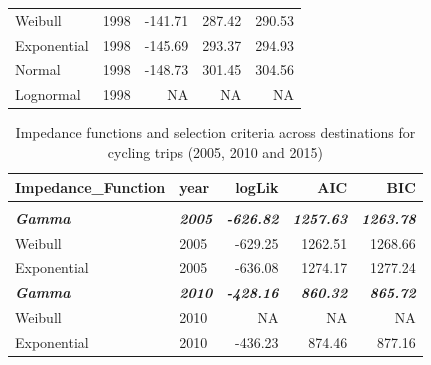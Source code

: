 \documentclass[
11pt, %
oneside, %
english, %
singlespacing, %
]{macthesis} %
\begin{document}
\begin{table}
\begin{tabular}[t]{llrrr}
\hspace{1em}Weibull & 1998 & -141.71 & 287.42 & 290.53\\
\hspace{1em}Exponential & 1998 & -145.69 & 293.37 & 294.93\\
\hspace{1em}Normal & 1998 & -148.73 & 301.45 & 304.56\\
\hspace{1em}Lognormal & 1998 & NA & NA & NA\\
\bottomrule
\end{tabular}
\end{table}

\begin{table}
\centering
\caption{\label{tab:ch03-make-table-08}\label{tab:ch03-table-08}Impedance functions and selection criteria across destinations for cycling trips (2005, 2010 and 2015)}
\centering
\fontsize{11}{13}\selectfont
\begin{tabular}[t]{llrrr}
\toprule
Impedance\_Function & year & logLik & AIC & BIC\\
\midrule
\addlinespace[0.3em]
\multicolumn{5}{l}{\textbf{Destination: Home}}\\
\begingroup\fontsize{10}{12}\selectfont \em{\textbf{\hspace{1em}Gamma}}\endgroup & \begingroup\fontsize{10}{12}\selectfont \em{\textbf{2005}}\endgroup & \begingroup\fontsize{10}{12}\selectfont \em{\textbf{-626.82}}\endgroup & \begingroup\fontsize{10}{12}\selectfont \em{\textbf{1257.63}}\endgroup & \begingroup\fontsize{10}{12}\selectfont \em{\textbf{1263.78}}\endgroup\\
\hspace{1em}Weibull & 2005 & -629.25 & 1262.51 & 1268.66\\
\hspace{1em}Exponential & 2005 & -636.08 & 1274.17 & 1277.24\\
\begingroup\fontsize{10}{12}\selectfont \em{\textbf{\hspace{1em}Gamma}}\endgroup & \begingroup\fontsize{10}{12}\selectfont \em{\textbf{2010}}\endgroup & \begingroup\fontsize{10}{12}\selectfont \em{\textbf{-428.16}}\endgroup & \begingroup\fontsize{10}{12}\selectfont \em{\textbf{860.32}}\endgroup & \begingroup\fontsize{10}{12}\selectfont \em{\textbf{865.72}}\endgroup\\
\hspace{1em}Weibull & 2010 & NA & NA & NA\\
\hspace{1em}Exponential & 2010 & -436.23 & 874.46 & 877.16\\

\end{tabular}
\end{table}
\end{document}
